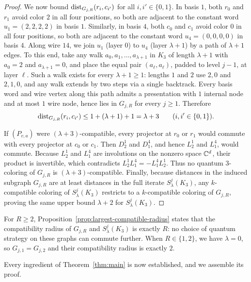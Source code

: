 \begin{proof}
We now bound $\operatorname{dist}_{G_{j,R}}(r_i,c_{i'})$ for all $i,i'\in\{0,1\}$. In basis $1$, both $r_0$ and $r_1$ avoid color $2$ in all four positions, so both are adjacent to the constant word $u_1=(2,2,2,2)$ in basis $1$. Similarly, in basis $4$, both $c_0$ and $c_1$ avoid color $0$ in all four positions, so both are adjacent to the constant word $u_4=(0,0,0,0)$ in basis $4$. Along wire $14$, we join $u_1$ (layer $0$) to $u_4$ (layer $\lambda+1$) by a path of $\lambda+1$ edges. To this end, take any walk $a_0,a_1,\ldots,a_{\lambda+1}$ in $K_3$ of length $\lambda+1$ with $a_0=2$ and $a_{\lambda+1}=0$, and place the equal pair $(a_\ell,a_\ell)$, padded to level $j-1$, at layer $\ell$. Such a walk exists for every $\lambda+1\ge1$: lengths $1$ and $2$ use $2,0$ and $2,1,0$, and any walk extends by two steps via a single backtrack. Every basis word and wire vertex along this path admits a presentation with $1$ internal node and at most $1$ wire node, hence lies in $G_{j,R}$ for every $j\ge1$. Therefore
\[
 \operatorname{dist}_{G_{j,R}}(r_i,c_{i'})\le 1+(\lambda+1)+1=\lambda+3\qquad (i,i'\in\{0,1\}).
\]

If $(P_{v,a})$ were $(\lambda+3)$-compatible, every projector at $r_0$ or $r_1$ would commute with every projector at $c_0$ or $c_1$. Then $D^1_2$ and $D^4_1$, and hence $L^1_2$ and $L^4_1$, would commute. Because $L^1_2$ and $L^4_1$ are involutions on the nonzero space $\mathbb C^d$, their product is invertible, which contradicts $L^1_2L^4_1=-L^4_1L^1_2$. Thus no quantum $3$-coloring of $G_{j,R}$ is $(\lambda+3)$-compatible. Finally, because distances in the induced subgraph $G_{j,R}$ are at least distances in the full iterate $S^j_\lambda(K_3)$, any $k$-compatible coloring of $S^j_\lambda(K_3)$ restricts to a $k$-compatible coloring of $G_{j,R}$, proving the same upper bound $\lambda+2$ for $S^j_\lambda(K_3)$.
\end{proof}

For $R\ge2$, Proposition~\ref{prop:largest-compatible-radius} states that the compatibility radius of $G_{j,R}$ and $S^j_\lambda(K_3)$ is exactly $R$: no choice of quantum strategy on these graphs can commute further. When $R\in\{1,2\}$, we have $\lambda=0$, so $G_{j,1}=G_{j,2}$ and their compatibility radius is exactly $2$.

Every ingredient of Theorem~\ref{thm:main} is now established, and we assemble its proof.

